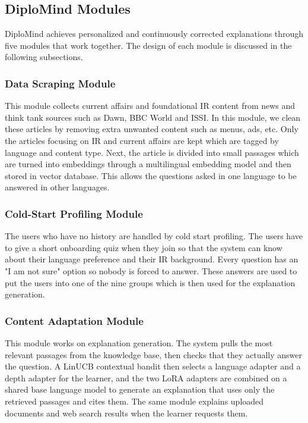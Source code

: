\documentclass{FastFyp}
\begin{document}
\subsection{DiploMind Modules}
DiploMind achieves personalized and continuously corrected explanations through five modules that work together. The design of each module is discussed in the following subsections.
 
\subsubsection{Data Scraping Module}
This module collects current affairs and foundational IR content from news and think tank sources such
as Dawn, BBC World and ISSI. In this module, we clean these articles by removing extra unwanted content such as menus, ads, etc. Only the articles focusing on IR and current affairs are kept which are tagged by language and content type. Next, the article is divided into small passages which are turned into embeddings through a multilingual embedding model and then stored in vector database. This allows the questions asked in one language to be answered in other languages.
 
\subsubsection{Cold-Start Profiling Module}
The users who have no history are handled by cold start profiling. The users have to give a short onboarding quiz when they join so that the system can know about their language preference and their IR background. Every question has an "I am not sure" option so nobody is forced to answer. These answers are used to put the users into one of the nine groups which is then used for the explanation generation.
 
\subsubsection{Content Adaptation Module}
This module works on explanation generation. The system pulls the most relevant passages from the knowledge base, then checks that they actually answer the question. A LinUCB contextual bandit then selects a language adapter and a depth adapter for the learner, and the two LoRA adapters are combined on a shared base language model to generate an explanation that uses only the retrieved passages and cites them. The same module explains uploaded documents and web search results when the learner requests them.
 
\end{document}

